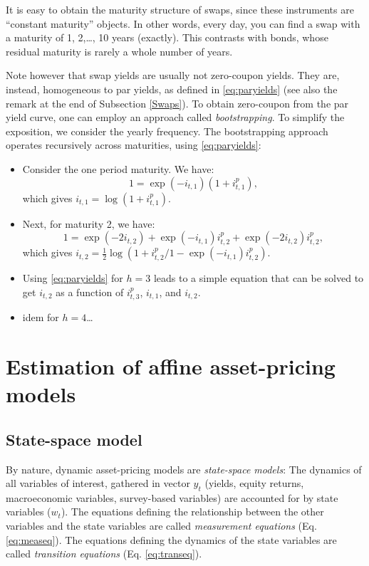 \documentclass[
  12pt,
]{book}
\providecommand{\tightlist}{%
  \setlength{\itemsep}{0pt}\setlength{\parskip}{0pt}}
\theoremstyle{definition}
\theoremstyle{definition}
\theoremstyle{definition}
\theoremstyle{definition}
\theoremstyle{remark}
\begin{document}
It is easy to obtain the maturity structure of swaps, since these instruments are ``constant maturity'' objects. In other words, every day, you can find a swap with a maturity of 1, 2,\ldots, 10 years (exactly). This contrasts with bonds, whose residual maturity is rarely a whole number of years.

Note however that swap yields are usually not zero-coupon yields. They are, instead, homogeneous to par yields, as defined in \eqref{eq:paryields} (see also the remark at the end of Subsection \ref{Swaps}). To obtain zero-coupon from the par yield curve, one can employ an approach called \emph{bootstrapping}. To simplify the exposition, we consider the yearly frequency. The bootstrapping approach operates recursively across maturities, using \eqref{eq:paryields}:

\begin{itemize}
\tightlist
\item
  Consider the one period maturity. We have:
  \[
  1 = \exp(-i_{t,1})(1 + i_{t,1}^p),
  \]
  which gives \(i_{t,1} = \log(1+i_{t,1}^p)\).
\item
  Next, for maturity 2, we have:
  \[
  1 = \exp(-2i_{t,2}) + \exp(-i_{t,1})i_{t,2}^p + \exp(-2i_{t,2})i_{t,2}^p,
  \]
  which gives \(i_{t,2} = \frac{1}{2}\log\left(1 + i_{t,2}^p \big/ 1 - \exp(-i_{t,1})i_{t,2}^p\right)\).
\item
  Using \eqref{eq:paryields} for \(h=3\) leads to a simple equation that can be solved to get \(i_{t,2}\) as a function of \(i_{t,3}^p\), \(i_{t,1}\), and \(i_{t,2}\).
\item
  idem for \(h=4\)\ldots{}
\end{itemize}

\hypertarget{Estimation}{%
\chapter{Estimation of affine asset-pricing models}\label{Estimation}}

\hypertarget{EstimationSSModel}{%
\section{State-space model}\label{EstimationSSModel}}

By nature, dynamic asset-pricing models are \emph{state-space models}: The dynamics of all variables of interest, gathered in vector \(y_t\) (yields, equity returns, macroeconomic variables, survey-based variables) are accounted for by state variables (\(w_t\)). The equations defining the relationship between the other variables and the state variables are called \emph{measurement equations} (Eq. \eqref{eq:measeq}). The equations defining the dynamics of the state variables are called \emph{transition equations} (Eq. \eqref{eq:transeq}).
\end{document}
